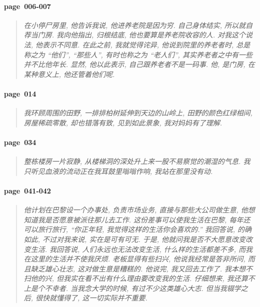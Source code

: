 \paragraph*{page~006-007}
\begin{quotation}
    \itshape
    在小停尸房里, 他告诉我说, 他进养老院是因为穷. 自己身体结实, 所以就自荐当门房. 我向他指出, 归根结底, 他也要算是养老院收容的人. 对我这个说法, 他表示不同意. 在此之前, 我就觉得诧异, 他说到院里的养老者时, 总是称之为 ``他们'', ``那些人'', 有时也称之为 ``老人们'', 其实养老者之中有一些并不比他年长. 显然, 他以此表示, 自己跟养老者不是一码事. 他, 是门房, 在某种意义上, 他还管着他们呢.
\end{quotation}

\paragraph*{page~014}
\begin{quotation}
    \itshape
    我环顾周围的田野, 一排排柏树延伸到天边的山岭上, 田野的颜色红绿相间, 房屋稀疏零散, 却也错落有致, 见到如此景象, 我对妈妈有了理解. 
\end{quotation}

\paragraph*{page~034}
\begin{quotation}
    \itshape
    整栋楼房一片寂静, 从楼梯洞的深处升上来一股不易察觉的潮湿的气息. 我只听见血液的流动正在我耳鼓里嗡嗡作响, 我站在那里没有动. 
\end{quotation}

\paragraph*{page~041-042}
\begin{quotation}
    \itshape
    他计划在巴黎设一个办事处, 负责市场业务, 直接与那些大公司做生意, 他想知道我是否愿意被派往那儿去工作. 这份差事可以使我生活在巴黎, 每年还可以旅行旅行, ``你正年轻, 我觉得这样的生活你会喜欢的.'' 我回答说, 的确如此, 不过对我来说, 实在是可有可无. 于是, 他就问我是否不大愿意改变改变生活. 我回答说, 人们永远也无法改变生活, 什么样的生活都差不多, 而我在这里的生活并不使我厌烦. 老板显得有些扫兴, 他说我经常是答非所问, 而且缺乏雄心壮志, 这对做生意是糟糕的. 他说完, 我又回去工作了. 我本想不扫他的兴, 但我实在看不出有什么理由要改变我的生活. 仔细想来, 我还算不上是个不幸者. 当我念大学的时候, 有过不少这类雄心大志. 但当我辍学之后, 很快就懂得了, 这一切实际并不重要. 
\end{quotation}

